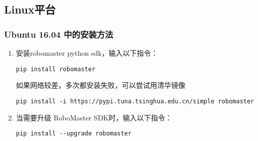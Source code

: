 \subsection{Linux平台}\label{sub_PyRM1_3}
\subsubsection{Ubuntu 16.04 中的安装方法}
\begin{enumerate}
\item 安装robomaster python sdk，输入以下指令：

\begin{lstlisting}[language=pythonC]
pip install robomaster
\end{lstlisting}

如果网络较差，多次都安装失败，可以尝试用清华镜像

\begin{lstlisting}[language=pythonC]
pip install -i https://pypi.tuna.tsinghua.edu.cn/simple robomaster
\end{lstlisting}

\item 当需要升级 RoboMaster SDK时，输入以下指令：

\begin{lstlisting}[language=pythonC]
pip install --upgrade robomaster
\end{lstlisting}

\end{enumerate}
